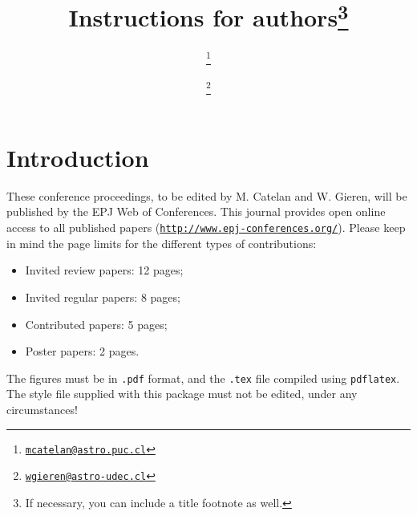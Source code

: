 \documentclass{webofc}
\begin{document}
%
\title{Instructions for authors\thanks{If necessary, you can include a title footnote as well.}}
%
%

\author{ \fnsep\thanks{\href{mailto:mcatelan@astro.puc.cl}{\tt mcatelan@astro.puc.cl}} \and
         \fnsep\thanks{\href{mailto:wgieren@astro-udec.cl}{\tt wgieren@astro-udec.cl}} 
}


%
\maketitle
%


\section{Introduction}\label{sec:intro}
These conference proceedings, to be edited by M. Catelan and W. Gieren, will be published by the EPJ Web of Conferences. This journal provides open online access to all published papers ({\tt\url{http://www.epj-conferences.org/}}). Please keep in mind the page limits for the different types of contributions: 

\begin{itemize}
  \item Invited review papers: 12 pages; 
  \item Invited regular papers: 8 pages; 
  \item Contributed papers: 5 pages; 
  \item Poster papers: 2 pages.  
\end{itemize}  

The figures must be in \lstinline!.pdf! format, and the \lstinline!.tex! file compiled using \lstinline!pdflatex!. The style file supplied with this package must not be edited, under any circumstances! 
\end{document}
